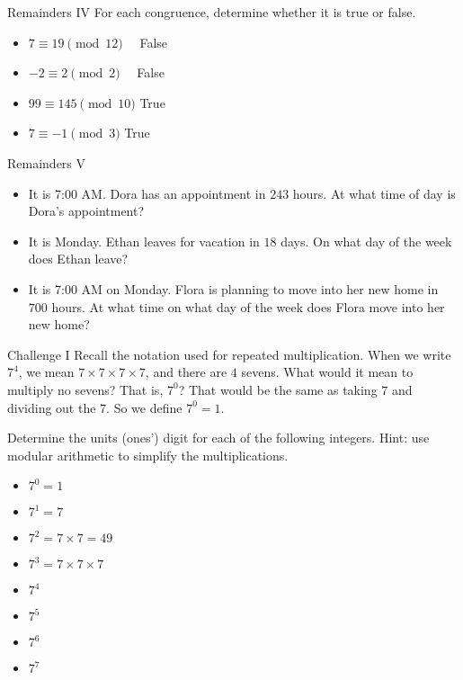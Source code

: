 \documentclass[12pt,letterpaper]{article}
\begin{document}
\begin{problem}{Remainders IV}
 For each congruence, determine whether it is true or false.

 \begin{itemize}
   \item $7 \equiv 19 \pmod {12}$ \hfill {}~~False
   \item $-2 \equiv 2 \pmod {2}$ \hfill {}~~False
   \item $99 \equiv 145 \pmod {10}$ \hfill True~~
   \item $7 \equiv -1 \pmod {3}$ \hfill True~~
 \end{itemize}
\end{problem}

\begin{problem}{Remainders V}

 \begin{itemize}
  \item It is 7:00 AM. Dora has an appointment in $243$ hours. At what time of
  day is Dora's appointment? 
  \item It is Monday. Ethan leaves for vacation in $18$ days. On what day of the
  week does Ethan leave? 
  \item It is 7:00 AM on Monday. Flora is planning to move into her new home in
  $700$ hours. At what time on what day of the week does Flora move into her new
  home? 
 \end{itemize}
\end{problem}

\begin{problem}{Challenge I}
 Recall the notation used for repeated multiplication. When we write $7^4$, we
 mean $7 \times 7 \times 7 \times 7$, and there are $4$ sevens. What would it
 mean to multiply no sevens? That is, $7^0$? That would be the same as taking
 $7$ and dividing out the $7$. So we define $7^0=1$.

 Determine the units (ones') digit for each of the following integers. Hint:
 use modular arithmetic to simplify the multiplications.

 \begin{itemize}
  \item $7^0 = 1$ \hfill {}
  \item $7^1 = 7$ \hfill {}
  \item $7^2 = 7 \times 7 = 49$ \hfill {}
  \item $7^3 = 7 \times 7 \times 7$ \hfill {}
  \item $7^4$ \hfill {}
  \item $7^5$ \hfill {}
  \item $7^6$ \hfill {}
  \item $7^7$ \hfill {}
 \end{itemize}
\end{problem}
\end{document}
